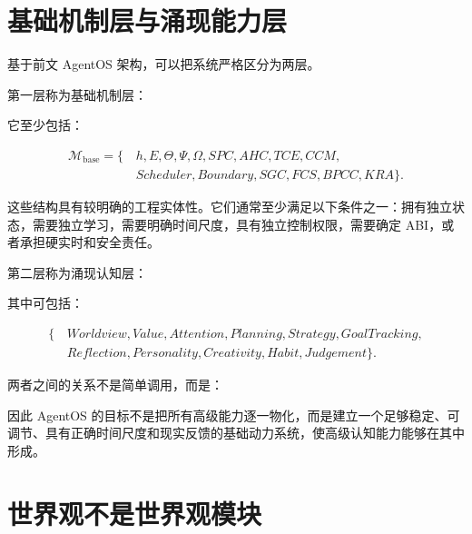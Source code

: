 \section{基础机制层与涌现能力层}

基于前文 AgentOS 架构，可以把系统严格区分为两层。

第一层称为基础机制层：

\begin{statementbox}
\centering
{}
\end{statementbox}

它至少包括：

\[
\begin{aligned}
\mathcal M_{\mathrm{base}}=\{\,&h,E,\Theta,\Psi,\Omega,SPC,AHC,TCE,CCM,\\
&Scheduler,Boundary,SGC,FCS,BPCC,KRA\}.
\end{aligned}
\]

这些结构具有较明确的工程实体性。它们通常至少满足以下条件之一：拥有独立状态，需要独立学习，需要明确时间尺度，具有独立控制权限，需要确定 ABI，或者承担硬实时和安全责任。

第二层称为涌现认知层：

\begin{statementbox}
\centering
{}
\end{statementbox}

其中可包括：

\[
\begin{aligned}
\{\,&Worldview,Value,Attention,Planning,Strategy,GoalTracking,\\
&Reflection,Personality,Creativity,Habit,Judgement\}.
\end{aligned}
\]

两者之间的关系不是简单调用，而是：

\begin{statementbox}
\centering
{}
\end{statementbox}

因此 AgentOS 的目标不是把所有高级能力逐一物化，而是建立一个足够稳定、可调节、具有正确时间尺度和现实反馈的基础动力系统，使高级认知能力能够在其中形成。

\section{世界观不是世界观模块}

